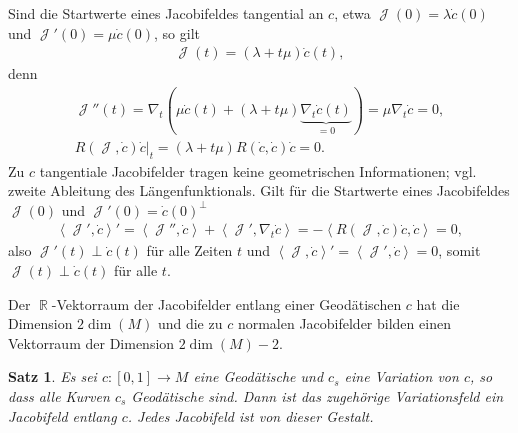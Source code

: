 \documentclass[paper=A4, twoside, chapterprefix=true, bibliography=totoc, headsepline]{scrbook}
\DeclareMathOperator{\R}{\mathbb{R}}
\DeclareMathOperator{\calJ}{\mathcal{J}}
\theoremstyle{plain}
\newtheorem{Satz}[Dfn]{Satz}
\theoremstyle{nonumberplain}
\theoremstyle{empty}
\theoremstyle{break}
\begin{document}
Sind die Startwerte eines Jacobifeldes tangential an $c$, etwa $\calJ(0) =
\lambda \dot c(0)$ und $\calJ'(0) = \mu \dot c(0)$, so gilt
\begin{align*}
  \calJ(t) = (\lambda + t\mu)\dot c(t),
\end{align*}
denn
\begin{align*}
  \calJ''(t) = \nabla_t(\mu \dot c(t) + (\lambda + t \mu)\underbrace{\nabla_t\dot c(t)}_{=0}) = \mu\nabla_t\dot c = 0,\\
  \left.R(\calJ,\dot c)\dot c\right|_t = (\lambda + t\mu)R(\dot c, \dot c)\dot c = 0.
\end{align*}
Zu $c$ tangentiale Jacobifelder tragen keine geometrischen Informationen; vgl. zweite Ableitung des L\"angenfunktionals.
Gilt f\"ur die Startwerte eines Jacobifeldes $\calJ(0)$ und $\calJ'(0) = \dot c(0)^{\perp}$
\begin{align*}
  \left<\calJ',\dot c\right>' = \left<\calJ'',\dot c\right> + \left<\calJ', \nabla_t\dot c\right> = - \left<R(\calJ,\dot c)\dot c,\dot c\right> = 0,
\end{align*}
also $\calJ'(t) \perp \dot c(t)$ f\"ur alle Zeiten $t$ und $\left<\calJ,\dot c\right>' = \left<\calJ',\dot c\right> = 0$, somit $\calJ(t) \perp \dot c(t)$ f\"ur alle $t$.

Der $\R$-Vektorraum der Jacobifelder entlang einer Geod\"atischen $c$ hat die Dimension $2 \dim(M)$ und die zu $c$ normalen Jacobifelder bilden einen Vektorraum der Dimension $2 \dim(M) - 2$.

\begin{Satz}\label{satz-9-5}
  Es sei $c \colon [0,1] \to M$ eine Geod\"atische und $c_s$ eine Variation von $c$, so dass alle Kurven $c_s$ Geod\"atische sind.
  Dann ist das zugeh\"orige Variationsfeld ein Jacobifeld entlang $c$.
  Jedes Jacobifeld ist von dieser Gestalt.
\end{Satz}
\end{document}
